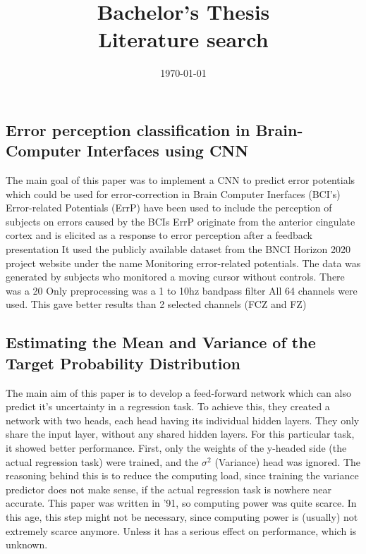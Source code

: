\documentclass[10pt]{article}
\title{{\bf Bachelor's Thesis} \\ Literature search}
\author{}
\date{\today}
\begin{document}
\maketitle

\subsection*{Error perception classification in Brain-Computer Interfaces using CNN \cite{correia2021error}}

The main goal of this paper was to implement a CNN to predict error potentials which could be used for error-correction in Brain Computer Inerfaces (BCI’s)
Error-related Potentials (ErrP) have been used to include the perception of subjects on errors caused by the BCIs
ErrP originate from the anterior cingulate cortex and is elicited as a response to error perception after a feedback presentation 
It used the publicly available dataset from the BNCI Horizon 2020 project website under the name Monitoring error-related potentials. The data was generated by subjects who monitored a moving cursor without controls. There was a 20%
Only preprocessing was a 1 to 10hz bandpass filter
All 64 channels were used. This gave better results than 2 selected channels (FCZ and FZ)

\subsection*{Estimating the Mean and Variance of the Target Probability Distribution \cite{nix1994estimating}}
The main aim of this paper is to develop a feed-forward network which can also predict it's uncertainty in a regression task. 
To achieve this, they created a network with two heads, each head having its individual hidden layers. They only share the input layer, 
without any shared hidden layers. For this particular task, it showed better performance. First, only the weights of the y-headed side 
(the actual regression task) were trained, and the $\sigma^2$ (Variance) head was ignored. The reasoning behind this is to reduce the computing load, since training the variance predictor does not make sense, 
if the actual regression task is nowhere near accurate. This paper was written in '91, so computing power was quite scarce. In this age, this step might not be necessary, since computing power is (usually)
 not extremely scarce anymore. Unless it has a serious effect on performance, which is unknown.
\end{document}
